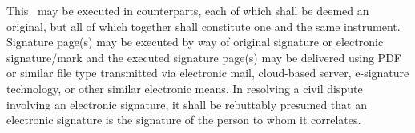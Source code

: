 This \amendmentTitle\ may be executed in counterparts, each of which shall be deemed an original, but all of which together shall constitute one and the same instrument. Signature page(s) may be executed by way of original signature or electronic signature/mark and the executed signature page(s) may be delivered using PDF or similar file type transmitted via electronic mail, cloud-based server, e-signature technology, or other similar electronic means. In resolving a civil dispute involving an electronic signature, it shall be rebuttably presumed that an electronic signature is the signature of the person to whom it correlates.
